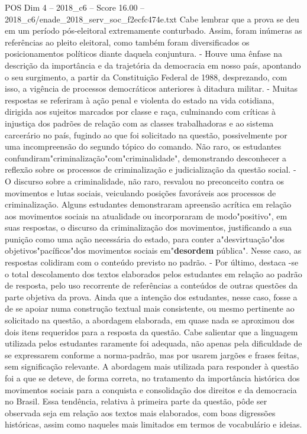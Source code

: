 \begin{textsample}{POS Dim 4 – 2018\_c6 – Score 16.00 – 2018\_c6/enade\_2018\_serv\_soc\_f2ecfc474e.txt}
Cabe lembrar que a prova se deu em um período pós-eleitoral extremamente conturbado.
Assim, foram inúmeras as referências ao pleito eleitoral, como também foram diversificados os posicionamentos políticos diante daquela conjuntura. - Houve uma ênfase na descrição da importância e da trajetória da democracia em nosso país, apontando o seu surgimento, a partir da Constituição Federal de 1988, desprezando, com isso, a vigência de processos democráticos anteriores à ditadura militar. - Muitas respostas se referiram à ação penal e violenta do estado na vida cotidiana, dirigida aos sujeitos marcados por classe e raça, culminando com críticas à injustiça dos padrões de relação com as classes trabalhadoras e ao sistema carcerário no país, fugindo ao que foi solicitado na questão, possivelmente por uma incompreensão do segundo tópico do comando.
Não raro, os estudantes confundiram"criminalização"com"criminalidade", demonstrando desconhecer a reflexão sobre os processos de criminalização e judicialização da questão social. - O discurso sobre a criminalidade, não raro, resvalou no preconceito contra os movimentos e lutas sociais, veiculando posições favoráveis aos processos de criminalização.
Alguns estudantes demonstraram apreensão acrítica em relação aos movimentos sociais na atualidade ou incorporaram de modo"positivo", em suas respostas, o discurso da criminalização dos movimentos, justificando a sua punição como uma ação necessária do estado, para conter a"desvirtuação"dos objetivos"pacíficos"dos movimentos sociais em"\textbf{desordem} pública".
Nesse caso, as respostas colidiram com o conteúdo previsto no padrão. - Por último, destaca -se o total descolamento dos textos elaborados pelos estudantes em relação ao padrão de resposta, pelo uso recorrente de referências a conteúdos de outras questões da parte objetiva da prova.
Ainda que a intenção dos estudantes, nesse caso, fosse a de se apoiar numa construção textual mais consistente, ou mesmo pertinente ao solicitado na questão, a abordagem elaborada, em quase nada se aproximou dos dois itens requeridos para a resposta da questão.
Cabe salientar que a linguagem utilizada pelos estudantes raramente foi adequada, não apenas pela dificuldade de se expressarem conforme a norma-padrão, mas por usarem jargões e frases feitas, sem significação relevante.
A abordagem mais utilizada para responder à questão foi a que se deteve, de forma correta, no tratamento da importância histórica dos movimentos sociais para a conquista e consolidação dos direitos e da democracia no Brasil.
Essa tendência, relativa à primeira parte da questão, pôde ser observada seja em relação aos textos mais elaborados, com boas digressões históricas, assim como naqueles mais limitados em termos de vocabulário e ideias.

\end{textsample}
